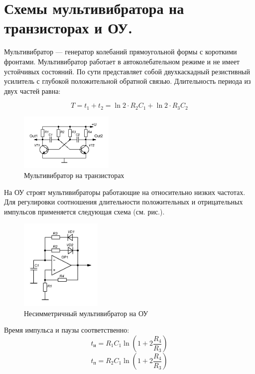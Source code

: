 \documentclass[unicode, 12pt, a4paper, oneside]{article}
\begin{document}
\section{Схемы мультивибратора на транзисторах и ОУ.}

Мультивибратор — генератор колебаний прямоугольной формы с короткими фронтами. Мультивибратор работает в автоколебательном режиме и не имеет устойчивых состояний. По сути представляет собой двухкаскадный резистивный усилитель с глубокой положительной обратной связью. Длительность периода из двух частей равна:

\begin{displaymath}
T = t_1 + t_2 = \ln 2 \cdot R_2 C_1 + \ln 2 \cdot R_3 C_2
\end{displaymath}
\begin{figure}[H]
\centering
\includegraphics[width=0.4\textwidth]{141_tranz.jpg}
\caption{Мультивибратор на транзисторах}
\end{figure}
На ОУ строят мультивибраторы работающие на относительно низких частотах. Для регулировки соотношения длительности положительных и отрицательных импульсов применяется следующая схема (см. рис.).
\begin{figure}[H]
\centering
\includegraphics[width=0.35\textwidth]{141_OU_unsim.jpg}
\caption{Несимметричный мультивибратор на ОУ}
\end{figure}

Время импульса и паузы соответственно:
\begin{displaymath}
t_\text{и} = R_1 C_1 \ln (1 + 2 \frac{R_4}{R_3} )
\end{displaymath}
\begin{displaymath}
t_\text{п} = R_2 C_1 \ln (1 + 2 \frac{R_4}{R_3} )
\end{displaymath}
\end{document}
